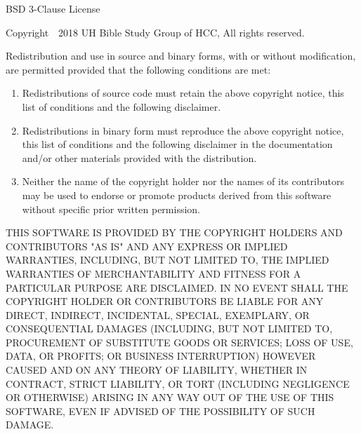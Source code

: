 \documentclass[Chinese,inNight]{CKBib}
\begin{document}
\begin{footnotesize}

\noindent BSD 3-Clause License

\vspace{1em}

\noindent Copyright~\textcopyright~2018 UH Bible Study Group of HCC, All rights reserved.

\vspace{1em}

\noindent Redistribution and use in source and binary forms, with or without modification, are permitted provided that the following conditions are met:

\begin{enumerate}
  \item Redistributions of source code must retain the above copyright notice, this list of conditions and the following disclaimer.
  \item Redistributions in binary form must reproduce the above copyright notice, this list of conditions and the following disclaimer in the documentation and/or other materials provided with the distribution.
  \item Neither the name of the copyright holder nor the names of its contributors may be used to endorse or promote products derived from this software without specific prior written permission.
\end{enumerate}

\noindent THIS SOFTWARE IS PROVIDED BY THE COPYRIGHT HOLDERS AND CONTRIBUTORS "AS IS" AND ANY EXPRESS OR IMPLIED WARRANTIES, INCLUDING, BUT NOT LIMITED TO, THE IMPLIED WARRANTIES OF MERCHANTABILITY AND FITNESS FOR A PARTICULAR PURPOSE ARE DISCLAIMED. IN NO EVENT SHALL THE COPYRIGHT HOLDER OR CONTRIBUTORS BE LIABLE FOR ANY DIRECT, INDIRECT, INCIDENTAL, SPECIAL, EXEMPLARY, OR CONSEQUENTIAL DAMAGES (INCLUDING, BUT NOT LIMITED TO, PROCUREMENT OF SUBSTITUTE GOODS OR SERVICES; LOSS OF USE, DATA, OR PROFITS; OR BUSINESS INTERRUPTION) HOWEVER CAUSED AND ON ANY THEORY OF LIABILITY, WHETHER IN CONTRACT, STRICT LIABILITY, OR TORT (INCLUDING NEGLIGENCE OR OTHERWISE) ARISING IN ANY WAY OUT OF THE USE OF THIS SOFTWARE, EVEN IF ADVISED OF THE POSSIBILITY OF SUCH DAMAGE.

\end{footnotesize}

\cleardoublepage

\thispagestyle{empty}
\pagestyle{empty}

\renewcommand{\contentsname}{目录}
\tableofcontents*
\end{document}
